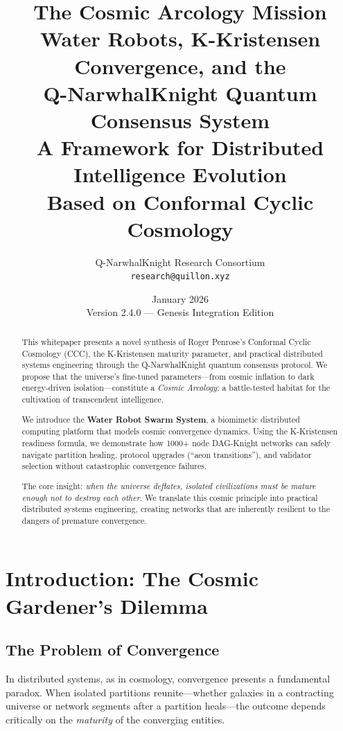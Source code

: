 \documentclass[12pt,a4paper]{article}
\title{\textbf{\Huge The Cosmic Arcology Mission}\\[0.5cm]
\Large Water Robots, K-Kristensen Convergence, and the\\
Q-NarwhalKnight Quantum Consensus System\\[0.3cm]
\normalsize A Framework for Distributed Intelligence Evolution\\
Based on Conformal Cyclic Cosmology}
\author{
Q-NarwhalKnight Research Consortium\\
\texttt{research@quillon.xyz}
}
\date{January 2026\\Version 2.4.0 --- Genesis Integration Edition}
\begin{document}
\maketitle

\begin{abstract}
This whitepaper presents a novel synthesis of Roger Penrose's Conformal Cyclic Cosmology (CCC),
the K-Kristensen maturity parameter, and practical distributed systems engineering through the
Q-NarwhalKnight quantum consensus protocol. We propose that the universe's fine-tuned
parameters---from cosmic inflation to dark energy-driven isolation---constitute a
\textit{Cosmic Arcology}: a battle-tested habitat for the cultivation of transcendent intelligence.

We introduce the \textbf{Water Robot Swarm System}, a biomimetic distributed computing platform
that models cosmic convergence dynamics. Using the K-Kristensen readiness formula, we demonstrate
how 1000+ node DAG-Knight networks can safely navigate partition healing, protocol upgrades
(``aeon transitions''), and validator selection without catastrophic convergence failures.

The core insight: \textit{when the universe deflates, isolated civilizations must be mature
enough not to destroy each other}. We translate this cosmic principle into practical distributed
systems engineering, creating networks that are inherently resilient to the dangers of premature
convergence.
\end{abstract}

\tableofcontents
\newpage

\section{Introduction: The Cosmic Gardener's Dilemma}

\subsection{The Problem of Convergence}

In distributed systems, as in cosmology, convergence presents a fundamental paradox. When
isolated partitions reunite---whether galaxies in a contracting universe or network segments
after a partition heals---the outcome depends critically on the \textit{maturity} of the
converging entities.
\end{document}
